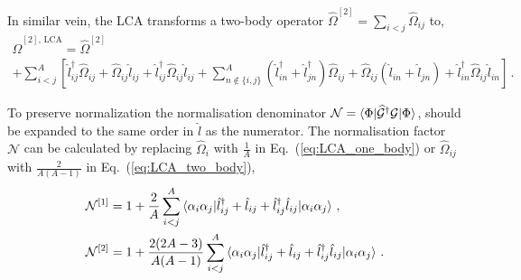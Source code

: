 \documentclass[10pt]{article}
\begin{document}
In similar vein, the LCA transforms a two-body operator $\widehat{\Omega}^{[2]} = \sum_{i<j} \widehat{\Omega}_{ij}$ to,
\begin{multline}
	\widehat{\Omega}^{[2],\,\text{LCA}} 
	= \widehat{\Omega}^{[2]} \\ + 
	\sum_{i<j}^{A} \left[ 
	\hat{l}_{ij}^{\dagger} \widehat{\Omega}_{ij} +
	\widehat{\Omega}_{ij} \hat{l}_{ij} +
	\hat{l}_{ij}^{\dagger} \widehat{\Omega}_{ij} \hat{l}_{ij} + 
	\sum_{n \notin \{i,j\}}^{A} 
	(\hat{l}_{in}^{\dagger} + \hat{l}_{jn}^{\dagger} ) \widehat{\Omega}_{ij} +
	\widehat{\Omega}_{ij} (\hat{l}_{in} + \hat{l}_{jn}) + 
	\hat{l}_{in}^{\dagger} \widehat{\Omega}_{ij} \hat{l}_{in}
	 \right] \, .
	 \label{eq:LCA_two_body}
\end{multline} 

To preserve normalization the normalisation denominator $ \mathcal{N} = \braket{ \Phi | \widehat{\mathcal{G}}{^\dagger} \mathcal{G} | \Phi }$, should be expanded to the same order in $\hat{l}$ as the numerator. The normalisation factor $\mathcal{N}$ can be calculated by replacing $\widehat{\Omega}_i$ with $\frac{1}{A}$ in Eq.~(\ref{eq:LCA_one_body}) or $\widehat{\Omega}_{ij}$ with $\frac{2}{A(A-1)}$ in Eq.~(\ref{eq:LCA_two_body}),
\begin{align}
	\mathcal{N}^{[1]} &=  1 + \frac{2}{A} \sum_{i < j}^{A} \braket{ \alpha_{i} \alpha_{j} | \hat{l}^{\dagger}_{ij} + \hat{l}_{ij} + \hat{l}^{\dagger}_{ij} \hat{l}_{ij} | \alpha_{i} \alpha_{j}}  \, ,
	\label{eq:LCA_norm_one_body}	
	\\
	\mathcal{N}^{[2]} &=  1 + \frac{2(2A-3)}{A(A-1)} \sum_{i < j}^{A} \braket{ \alpha_{i} \alpha_{j} | \hat{l}^{\dagger}_{ij} + \hat{l}_{ij} + \hat{l}^{\dagger}_{ij} \hat{l}_{ij} | \alpha_{i} \alpha_{j}} \, .
	\label{eq:LCA_norm_two_body}
\end{align}
\end{document}
